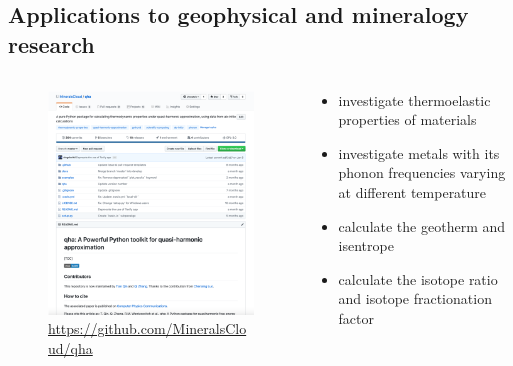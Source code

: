 \documentclass[13pt,aspectratio=169]{beamer}
\begin{document}
\subsection{Applications to geophysical and mineralogy research}
\begin{frame}{\subsecname}
	\begin{columns}
		\begin{column}{0.45\textwidth}
			\begin{figure}
				\includegraphics[height=0.8\textheight]{images/website}%
				\captionsetup{labelformat=empty}
				\caption{\scriptsize\url{https://github.com/MineralsCloud/qha}}
			\end{figure}
		\end{column}

		\begin{column}{0.45\textwidth}
			\begin{itemize}[<+(1)->]
				\item investigate thermoelastic properties of materials \cite{Wu:2011ea}
				\item investigate metals with its phonon frequencies varying at different temperature
				\item calculate the geotherm and isentrope \cite{Cardona:2017dd}
				\item calculate the isotope ratio and isotope fractionation factor
			\end{itemize}
		\end{column}
	\end{columns}
\end{frame}
\end{document}
